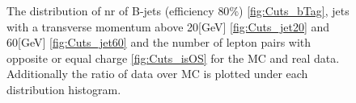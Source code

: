 \documentclass{article}
\begin{document}
\begin{figure}
    \caption{The distribution of nr of B-jets (efficiency $80\%$) \ref{fig:Cuts_bTag}, jets with a transverse momentum above 20[GeV] \ref{fig:Cuts_jet20}  and 60[GeV] \ref{fig:Cuts_jet60} and the number of lepton pairs with opposite or equal charge \ref{fig:Cuts_isOS} for the MC and real data. Additionally the ratio of data over MC is plotted under each distribution histogram.}
    \label{fig:var2}
\end{figure}
\newpage
\end{document}
